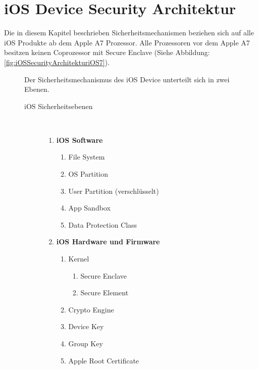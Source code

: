 \pagebreak
\section{iOS Device Security Architektur}
\label{sec:iOSSecArchitektur}

Die in diesem Kapitel beschrieben Sicherheitsmechanismen beziehen sich auf alle iOS Produkte ab dem Apple A7 Prozessor. Alle Prozessoren vor dem Apple A7 besitzen keinen Coprozessor mit Secure Enclave (Siehe Abbildung: \ref{fig:iOSSecurityArchitekturiOS7}).\par

\begin{figure}[htb]
  \begin{minipage}{0.6\textwidth} 
  Der Sicherheitsmechanismus des iOS Device unterteilt sich in zwei Ebenen. 
  		\begin{description}
   			\item[ iOS Sicherheitsebenen]~\par
         		\begin{enumerate}	
				\item  \textbf{iOS Software}
					\begin{enumerate}
       						\item File System
         					\item OS Partition
						\item User Partition (verschlüsselt)
						\item App Sandbox
						\item Data Protection Class
      					\end{enumerate}
      				\item  \textbf{iOS Hardware und Firmware}~\par
					\begin{enumerate}
       						\item Kernel
						\begin{enumerate}
						\item Secure Enclave
						\item Secure Element
         					\end{enumerate}	
						\item Crypto Engine
						\item Device Key
						\item Group Key
						\item Apple Root Certificate
      					\end{enumerate}
			\end{enumerate}

\end{description}
\end{minipage}
\end{figure}
